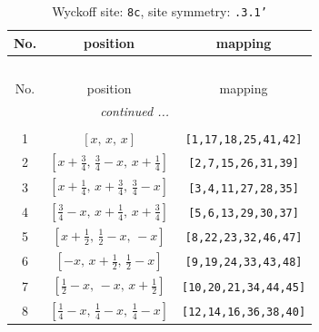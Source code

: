 \documentclass[fleqn,8pt]{jsarticle}
\begin{document}
\renewcommand{\arraystretch}{1.2}
\begin{longtable}{ccc}
\caption{Wyckoff site: {\tt 8c}, site symmetry: {\tt .3.1'}}
 \\
 \hline \hline
No. & position & mapping \\ \hline \endfirsthead

\multicolumn{2}{l}{\tablename\ \thetable{}} \\
 \hline \hline
No. & position & mapping \\ \hline \endhead

 \hline \hline
\multicolumn{2}{r}{\footnotesize\it continued ...} \\ \endfoot

 \hline \hline
\multicolumn{2}{r}{} \\ \endlastfoot

1 & $\left[ x,\, x,\, x \right]$ & {\tt [1,17,18,25,41,42]} \\ \hline
2 & $\left[ x + \frac{3}{4},\, \frac{3}{4} - x,\, x + \frac{1}{4} \right]$ & {\tt [2,7,15,26,31,39]} \\ \hline
3 & $\left[ x + \frac{1}{4},\, x + \frac{3}{4},\, \frac{3}{4} - x \right]$ & {\tt [3,4,11,27,28,35]} \\ \hline
4 & $\left[ \frac{3}{4} - x,\, x + \frac{1}{4},\, x + \frac{3}{4} \right]$ & {\tt [5,6,13,29,30,37]} \\ \hline
5 & $\left[ x + \frac{1}{2},\, \frac{1}{2} - x,\, - x \right]$ & {\tt [8,22,23,32,46,47]} \\ \hline
6 & $\left[ - x,\, x + \frac{1}{2},\, \frac{1}{2} - x \right]$ & {\tt [9,19,24,33,43,48]} \\ \hline
7 & $\left[ \frac{1}{2} - x,\, - x,\, x + \frac{1}{2} \right]$ & {\tt [10,20,21,34,44,45]} \\ \hline
8 & $\left[ \frac{1}{4} - x,\, \frac{1}{4} - x,\, \frac{1}{4} - x \right]$ & {\tt [12,14,16,36,38,40]} \\
\end{longtable}
\renewcommand{\arraystretch}{1.2}
\end{document}

